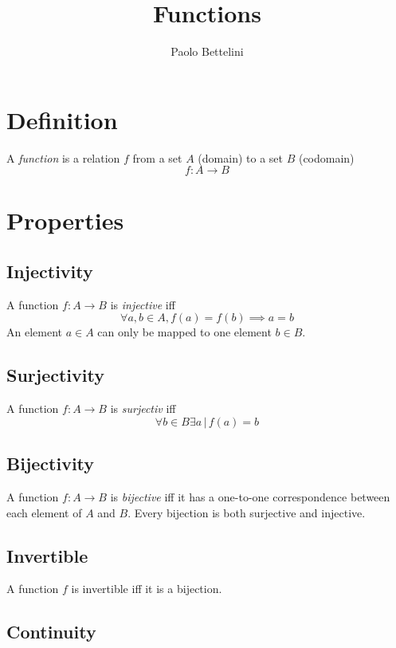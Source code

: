 \documentclass{article}
\title{Functions}
\author{Paolo Bettelini}
\date{}
\begin{document}
\maketitle
\tableofcontents
\pagebreak

\section{Definition}

A \textit{function} is a relation \(f\)
from a set \(A\) (domain) to a set \(B\) (codomain)
\[
    f: A \to B
\]

\section{Properties}

\subsection{Injectivity}

A function \(f:A\to B\) is \textit{injective} iff
\[
    \forall a,b \in A, f(a) = f(b) \implies a = b
\]
An element \(a\in A\) can only be mapped to one element \(b\in B\).

\subsection{Surjectivity}

A function \(f:A\to B\) is \textit{surjectiv} iff
\[
    \forall b \in B \exists a \,|\, f(a)=b
\]

\subsection{Bijectivity}

A function \(f:A\to B\) is \textit{bijective} iff
it has a one-to-one correspondence between each element of \(A\) and  \(B\).
Every bijection is both surjective and injective.

\subsection{Invertible}

A function \(f\) is invertible iff it is a bijection.

\subsection{Continuity}
\end{document}
